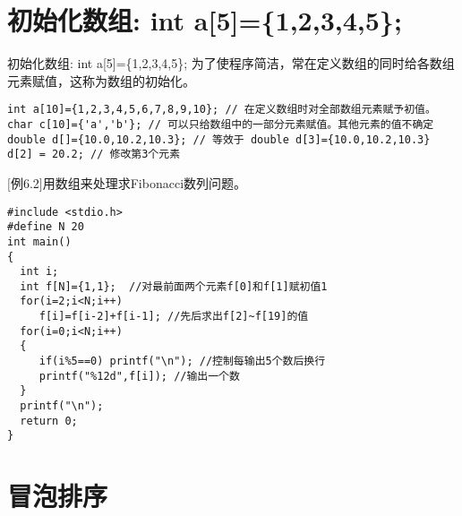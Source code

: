 \section{初始化数组: int a[5]=\{1,2,3,4,5\};}

\begin{frame}{初始化数组: int a[5]=\{1,2,3,4,5\};}
为了使程序简洁，常在定义数组的同时给各数组元素赋值，这称为数组的初始化。
\begin{lstlisting}
int a[10]={1,2,3,4,5,6,7,8,9,10}; // 在定义数组时对全部数组元素赋予初值。
char c[10]={'a','b'}; // 可以只给数组中的一部分元素赋值。其他元素的值不确定
double d[]={10.0,10.2,10.3}; // 等效于 double d[3]={10.0,10.2,10.3}
d[2] = 20.2; // 修改第3个元素
\end{lstlisting}
\end{frame}

\begin{frame}
$[$例6.2$]$用数组来处理求Fibonacci数列问题。
\begin{lstlisting}
#include <stdio.h>
#define N 20
int main()
{
  int i;
  int f[N]={1,1};  //对最前面两个元素f[0]和f[1]赋初值1
  for(i=2;i<N;i++)
     f[i]=f[i-2]+f[i-1]; //先后求出f[2]~f[19]的值
  for(i=0;i<N;i++)
  {
     if(i%5==0) printf("\n"); //控制每输出5个数后换行
     printf("%12d",f[i]); //输出一个数
  }
  printf("\n");
  return 0;
}
\end{lstlisting}
\end{frame}

\section{冒泡排序}

